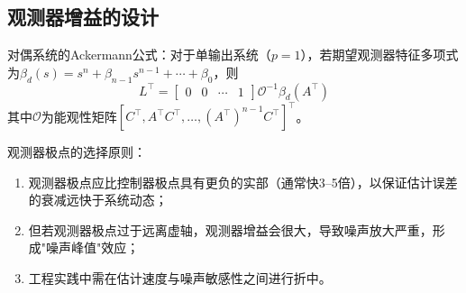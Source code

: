 \subsection{观测器增益的设计}

对偶系统的Ackermann公式：对于单输出系统（$p=1$），若期望观测器特征多项式为$\beta_d(s) = s^n + \beta_{n-1}s^{n-1} + \cdots + \beta_0$，则
\[
L^{\top} = \begin{bmatrix} 0 & 0 & \cdots & 1 \end{bmatrix} \mathcal{O}^{-1} \beta_d(A^{\top})
\]
其中$\mathcal{O}$为能观性矩阵$[C^{\top}, A^{\top}C^{\top}, \dots, (A^{\top})^{n-1}C^{\top}]^{\top}$。

观测器极点的选择原则：
\begin{enumerate}
\item 观测器极点应比控制器极点具有更负的实部（通常快3--5倍），以保证估计误差的衰减远快于系统动态；
\item 但若观测器极点过于远离虚轴，观测器增益会很大，导致噪声放大严重，形成"噪声峰值"效应；
\item 工程实践中需在估计速度与噪声敏感性之间进行折中。
\end{enumerate}

